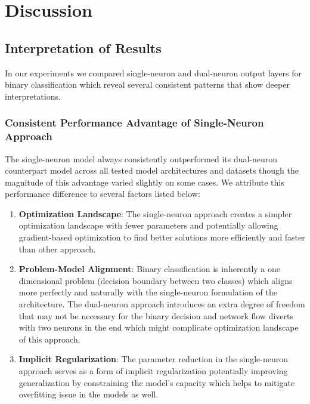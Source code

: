 \section{Discussion}

\subsection{Interpretation of Results}

In our experiments we compared single-neuron and dual-neuron output layers for binary classification which reveal several consistent patterns that show deeper interpretations.

\subsubsection{Consistent Performance Advantage of Single-Neuron Approach}

The single-neuron model always consistently outperformed its dual-neuron counterpart model across all tested model architectures and datasets though the magnitude of this advantage varied slightly on some cases. We attribute this performance difference to several factors listed below:

\begin{enumerate}
\item \textbf{Optimization Landscape}: The single-neuron approach creates a simpler optimization landscape with fewer parameters and potentially allowing gradient-based optimization to find better solutions more efficiently and faster than other approach.

\item \textbf{Problem-Model Alignment}: Binary classification is inherently a one dimensional problem (decision boundary between two classes) which aligns more perfectly and naturally with the single-neuron formulation of the architecture. The dual-neuron approach introduces an extra degree of freedom that may not be necessary for the binary decision and network flow diverts with two neurons in the end which might complicate optimization landscape of this approach.

\item \textbf{Implicit Regularization}: The parameter reduction in the single-neuron approach serves as a form of implicit regularization potentially improving generalization by constraining the model's capacity which helps to mitigate overfitting issue in the models as well.
\end{enumerate}

